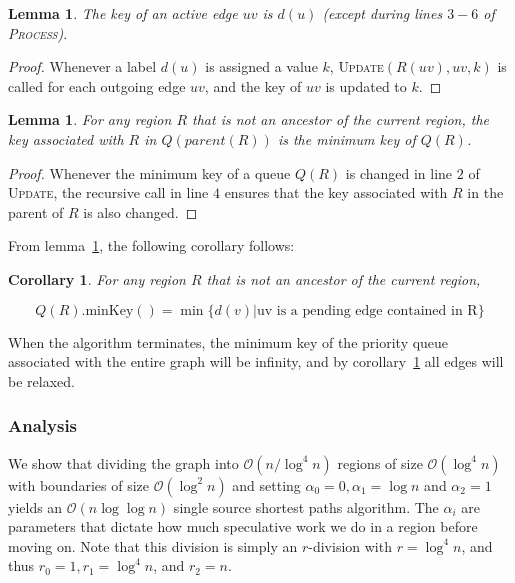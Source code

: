 \documentclass[11pt]{article}
\newtheorem{corollary}{Corollary}[theorem]
\newtheorem{lemma}[theorem]{Lemma}
\begin{document}
\begin{lemma}
  The key of an active edge $uv$ is $d(u)$ (except during lines $3-6$ of \textsc{Process}).
\end{lemma}

\begin{proof}
  Whenever a label $d(u)$ is assigned a value $k$, \textsc{Update}$(R(uv),uv,k)$ is called for each outgoing edge $uv$, and the key of $uv$ is updated to $k$.
\end{proof}

\begin{lemma}
  \label{lemma:invariant}
  For any region $R$ that is not an ancestor of the current region, the key associated with $R$ in $Q(parent(R))$ is the minimum key of $Q(R)$.
\end{lemma}

\begin{proof}
  Whenever the minimum key of a queue $Q(R)$ is changed in line $2$ of \textsc{Update}, the recursive call in line $4$ ensures that the key associated with $R$ in the parent of $R$ is also changed.
\end{proof}

From lemma~\ref{lemma:invariant}, the following corollary follows:\\

\begin{corollary}
\label{cor:relaxed}
  For any region $R$ that is not an ancestor of the current region,

  \[
    Q(R).\text{minKey}() = \min \{ d(v) | \text{uv is a pending edge contained in R} \}
  \]
\end{corollary}

When the algorithm terminates, the minimum key of the priority queue associated with the entire graph will be infinity, and by corollary~\ref{cor:relaxed} all edges will be relaxed.

\subsubsection{Analysis}
\label{sec:analysis}

We show that dividing the graph into $\mathcal{O}(n/\log^4n)$ regions of size $\mathcal{O}(\log^4 n)$ with boundaries of size $\mathcal{O}(\log^2 n)$ and setting $\alpha_0 = 0, \alpha_1 = \log n$ and $\alpha_2 = 1$ yields an $\mathcal{O}(n \log \log n)$ single source shortest paths algorithm. The $\alpha_i$ are parameters that dictate how much speculative work we do in a region before moving on. Note that this division is simply an $r$-division with $r=\log^4 n$, and thus $r_0=1, r_1 = \log^4 n$, and $r_2 = n$.
\end{document}

